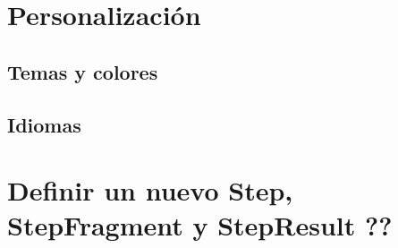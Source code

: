 \section{Personalización}

\subsection{Temas y colores}

\subsection{Idiomas}

\section{Definir un nuevo Step, StepFragment y StepResult ??} \label{sec:definir_steps}


